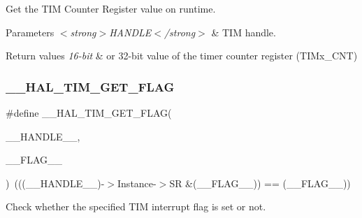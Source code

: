 Get the T\+IM Counter Register value on runtime. 


\begin{DoxyParams}{Parameters}
{\em $<$strong$>$\+H\+A\+N\+D\+L\+E$<$/strong$>$} & T\+IM handle. \\
\hline
\end{DoxyParams}

\begin{DoxyRetVals}{Return values}
{\em 16-\/bit} & or 32-\/bit value of the timer counter register (T\+I\+Mx\+\_\+\+C\+NT) \\
\hline
\end{DoxyRetVals}
\mbox{\label{group___t_i_m___exported___macros_ga96d98c66ad9d85f00c148de99888ef19}} 
\subsubsection{\texorpdfstring{\_\_HAL\_TIM\_GET\_FLAG}{\_\_HAL\_TIM\_GET\_FLAG}}
{\footnotesize\ttfamily \#define \+\_\+\+\_\+\+H\+A\+L\+\_\+\+T\+I\+M\+\_\+\+G\+E\+T\+\_\+\+F\+L\+AG(\begin{DoxyParamCaption}\item[{}]{\+\_\+\+\_\+\+H\+A\+N\+D\+L\+E\+\_\+\+\_\+,  }\item[{}]{\+\_\+\+\_\+\+F\+L\+A\+G\+\_\+\+\_\+ }\end{DoxyParamCaption})~(((\+\_\+\+\_\+\+H\+A\+N\+D\+L\+E\+\_\+\+\_\+)-\/$>$Instance-\/$>$SR \&(\+\_\+\+\_\+\+F\+L\+A\+G\+\_\+\+\_\+)) == (\+\_\+\+\_\+\+F\+L\+A\+G\+\_\+\+\_\+))}



Check whether the specified T\+IM interrupt flag is set or not. 


